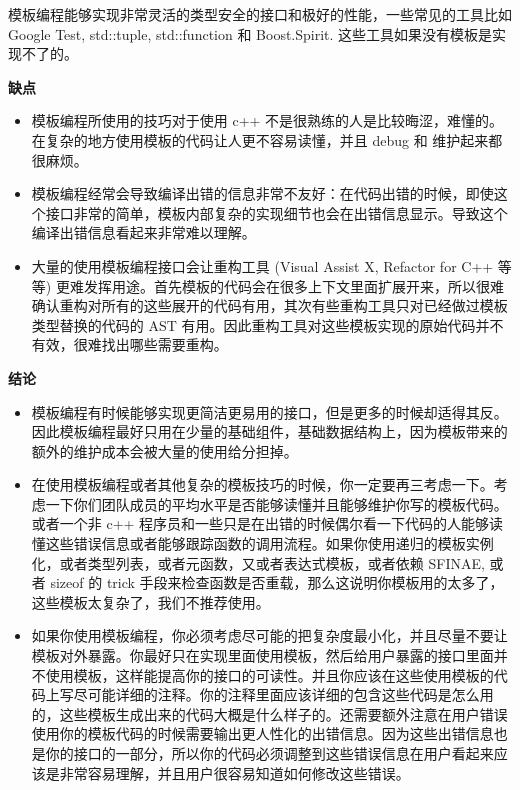 模板编程能够实现非常灵活的类型安全的接口和极好的性能，一些常见的工具比如 Google Test, std::tuple, std::function 和 Boost.Spirit. 这些工具如果没有模板是实现不了的。

\textbf{缺点}

\begin{itemize}
  \item 模板编程所使用的技巧对于使用 c++ 不是很熟练的人是比较晦涩，难懂的。在复杂的地方使用模板的代码让人更不容易读懂，并且 debug 和 维护起来都很麻烦。
  \item 模板编程经常会导致编译出错的信息非常不友好：在代码出错的时候，即使这个接口非常的简单，模板内部复杂的实现细节也会在出错信息显示。导致这个编译出错信息看起来非常难以理解。
  \item 大量的使用模板编程接口会让重构工具 (Visual Assist X, Refactor for C++ 等等) 更难发挥用途。首先模板的代码会在很多上下文里面扩展开来，所以很难确认重构对所有的这些展开的代码有用，其次有些重构工具只对已经做过模板类型替换的代码的 AST 有用。因此重构工具对这些模板实现的原始代码并不有效，很难找出哪些需要重构。
\end{itemize}

\textbf{结论}

\begin{itemize}
  \item 模板编程有时候能够实现更简洁更易用的接口，但是更多的时候却适得其反。因此模板编程最好只用在少量的基础组件，基础数据结构上，因为模板带来的额外的维护成本会被大量的使用给分担掉。
  \item 在使用模板编程或者其他复杂的模板技巧的时候，你一定要再三考虑一下。考虑一下你们团队成员的平均水平是否能够读懂并且能够维护你写的模板代码。或者一个非 c++ 程序员和一些只是在出错的时候偶尔看一下代码的人能够读懂这些错误信息或者能够跟踪函数的调用流程。如果你使用递归的模板实例化，或者类型列表，或者元函数，又或者表达式模板，或者依赖 SFINAE, 或者 sizeof 的 trick 手段来检查函数是否重载，那么这说明你模板用的太多了，这些模板太复杂了，我们不推荐使用。
  \item 如果你使用模板编程，你必须考虑尽可能的把复杂度最小化，并且尽量不要让模板对外暴露。你最好只在实现里面使用模板，然后给用户暴露的接口里面并不使用模板，这样能提高你的接口的可读性。并且你应该在这些使用模板的代码上写尽可能详细的注释。你的注释里面应该详细的包含这些代码是怎么用的，这些模板生成出来的代码大概是什么样子的。还需要额外注意在用户错误使用你的模板代码的时候需要输出更人性化的出错信息。因为这些出错信息也是你的接口的一部分，所以你的代码必须调整到这些错误信息在用户看起来应该是非常容易理解，并且用户很容易知道如何修改这些错误。
\end{itemize}